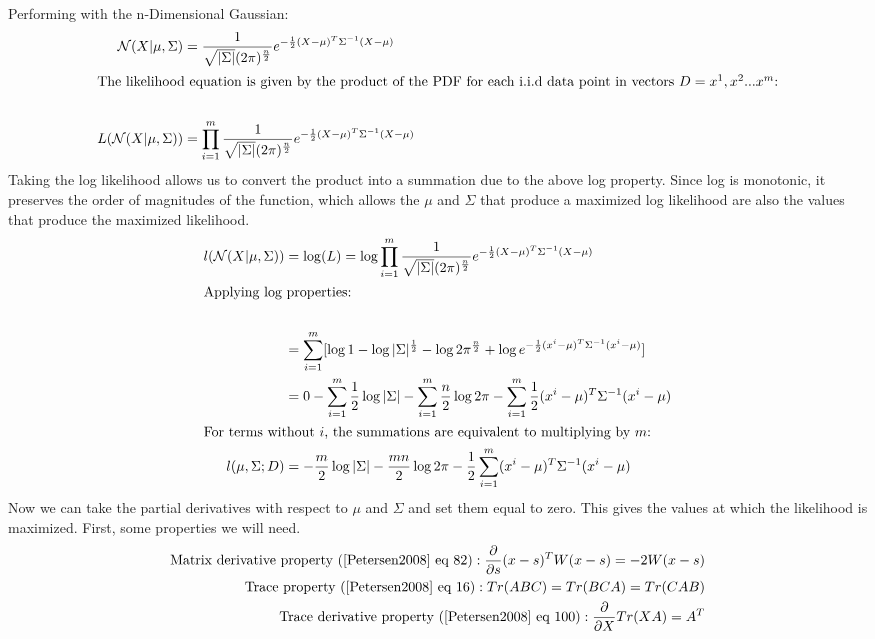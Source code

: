 \documentclass[twoside,12pt]{article}
\begin{document}
\begin{enumerate}[label*=\arabic*.]
Performing with the n-Dimensional Gaussian:
\begin{align*}
    \mathcal{N}(X|\mu,\Sigma) &= \frac{1}{\sqrt{|\Sigma|}(2\pi)^{\frac{n}{2}}}e^{-\frac{1}{2}(X-\mu)^T\Sigma^{-1}(X-\mu)}\\
    \intertext{The likelihood equation is given by the product of the PDF for each i.i.d data point in vectors $D = {x^1,x^2...x^m}$:}\\
    L (\mathcal{N}(X|\mu,\Sigma)) &= \prod_{i=1}^m \frac{1}{\sqrt{|\Sigma|}(2\pi)^{\frac{n}{2}}}e^{-\frac{1}{2}(X-\mu)^T\Sigma^{-1}(X-\mu)}
\end{align*}
Taking the log likelihood allows us to convert the product into a summation due to the above log property. Since log is monotonic, it preserves the order of magnitudes of the function, which allows the $\mu$ and  $\Sigma$ that produce a maximized log likelihood are also the values that produce the maximized likelihood.
\begin{align*}
    l (\mathcal{N}(X|\mu,\Sigma)) &= \log(L) = \log\prod_{i=1}^m \frac{1}{\sqrt{|\Sigma|}(2\pi)^{\frac{n}{2}}}e^{-\frac{1}{2}(X-\mu)^T\Sigma^{-1}(X-\mu)}\\
    \intertext{Applying log properties:}\\
    &= \sum_{i=1}^m[ \log{1} -\log{|\Sigma|^{\frac{1}{2}}} - \log{2\pi^{\frac{n}{2}}} + \log{e^{-\frac{1}{2}(x^i-\mu)^T\Sigma^{-1}(x^i-\mu)}}]\\
    &=  0 - \sum_{i=1}^m\frac{1}{2}\log{|\Sigma|} - \sum_{i=1}^m\frac{n}{2}\log{2\pi} - \sum_{i=1}^m \frac{1}{2}(x^i-\mu)^T\Sigma^{-1}(x^i-\mu)\\
    \intertext{For terms without $i$, the summations are equivalent to multiplying by $m$:}
    l(\mu,\Sigma;D)&=  -\frac{m}{2}\log{|\Sigma|} - \frac{mn}{2}\log{2\pi} - \frac{1}{2}\sum_{i=1}^m (x^i-\mu)^T\Sigma^{-1}(x^i-\mu)\\
\end{align*}
Now we can take the partial derivatives with respect to $\mu$ and $\Sigma$ and set them equal to zero. This gives the values at which the likelihood is maximized. First, some properties we will need.
\begin{align}
    \text{Matrix derivative property (\cite{Petersen2008} eq 82)}: \frac{\partial}{\partial s}(x - s)^T W(x - s) = -2W(x-s) \\
    \text{Trace property (\cite{Petersen2008} eq 16)}: Tr(ABC) = Tr(BCA) = Tr(CAB) \\
    \text{Trace derivative property (\cite{Petersen2008} eq 100)}: \frac{\partial}{\partial X}Tr(XA) = A^T \\

\end{align}
\end{enumerate}
\end{document}
